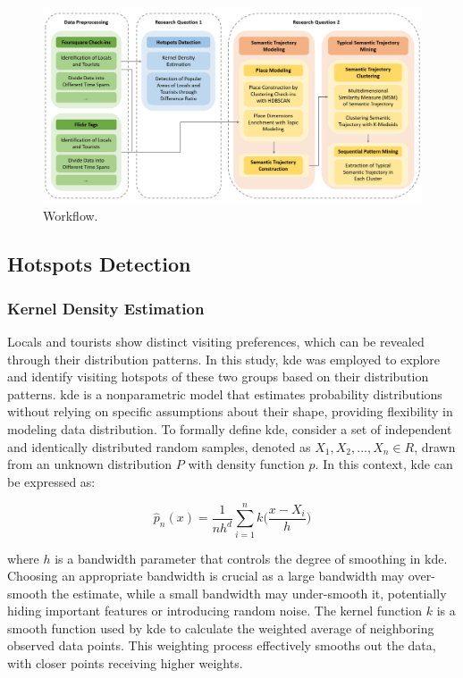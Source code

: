 \documentclass{article}
\theoremstyle{definition}
\theoremstyle{remark}
\begin{document}
\begin{figure}[h!]
\centering
\includegraphics[width=1\textwidth]{figures/workflow.png}
\caption{\label{fig:workflow}Workflow.}
\end{figure}


\subsection{Hotspots Detection}\label{hotspots_detection}

\subsubsection{Kernel Density Estimation}
Locals and tourists show distinct visiting preferences, which can be revealed through their distribution patterns. In this study, \acrfull{kde} was employed to explore and identify visiting hotspots of these two groups based on their distribution patterns. \acrshort{kde} is a nonparametric model that estimates probability distributions without relying on specific assumptions about their shape, providing flexibility in modeling data distribution. To formally define \acrshort{kde}, consider a set of independent and identically distributed random samples, denoted as $X_{1}, X_{2}, ..., X_{n} \in R$, drawn from an unknown distribution $P$ with density function $p$. In this context, \acrshort{kde} can be expressed as:

\begin{equation} \label{eq:kde}
\hat{p}_{n}(x) = \frac{1}{nh^{d}} \sum_{i=1}^n k\bigg(\frac{x-X_i}{h}\bigg)
\end{equation}

where $h$ is a bandwidth parameter that controls the degree of smoothing in \acrshort{kde}. Choosing an appropriate bandwidth is crucial as a large bandwidth may over-smooth the estimate, while a small bandwidth may under-smooth it, potentially hiding important features or introducing random noise. The kernel function $k$ is a smooth function used by \acrshort{kde} to calculate the weighted average of neighboring observed data points. This weighting process effectively smooths out the data, with closer points receiving higher weights.
\end{document}
